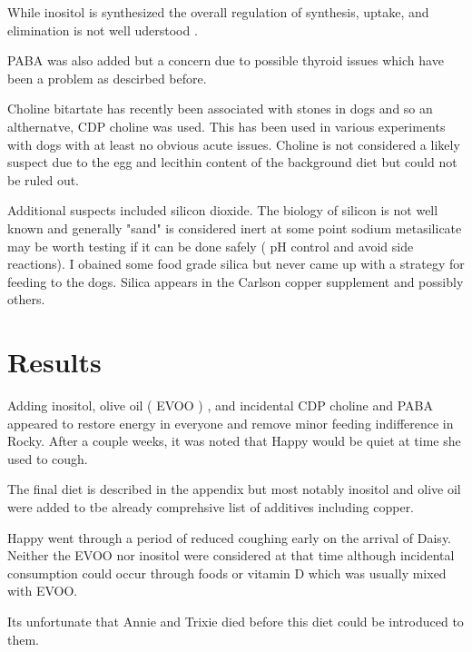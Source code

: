 While inositol is synthesized the overall regulation of synthesis,
uptake, and elimination is not well uderstood
\cite{Su_Ko_Saiardi_Regulations_inositol_2023}.




PABA was also added but a concern due to possible thyroid issues which
have been a problem as descirbed before.

Choline bitartate has recently been associated with stones in dogs
\cite{PMC12035869}
and so an althernatve, CDP choline was used.
This has been used in various experiments with dogs
\cite{PMC9151482}
\cite{PMID34715589}
with at least no obvious acute issues. 
 Choline is not considered
a likely suspect due to the egg and lecithin content of the background
diet but could not be ruled out. 


Additional suspects included silicon dioxide. The biology of silicon
is not well known and generally "sand" is considered inert
at some point sodium metasilicate may be worth testing if it can
be done safely ( pH control and avoid side reactions). 
I obained some food grade silica but never came up with a strategy
for feeding to the dogs. 
Silica appears in the Carlson copper supplement and possibly others.


\section{ Results }

Adding inositol, olive oil ( EVOO ) , and incidental CDP choline
and PABA appeared to restore energy in  everyone
and remove minor feeding indifference
in Rocky.  After a couple weeks, it was noted that Happy would be quiet
at time she used to cough. 


The final diet is described in the appendix   but most notably
inositol and olive oil were added to tbe already comprehsive list
of additives including copper.

Happy went through a period of reduced coughing early on the arrival
of Daisy. Neither the EVOO nor inositol were considered at that time
although incidental consumption could occur through foods or vitamin
D which was usually mixed with EVOO. 

Its unfortunate that Annie and Trixie died before this diet could
be introduced to them.


